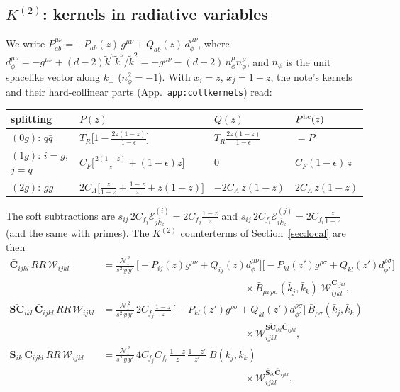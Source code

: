 \documentclass[11pt,a4paper]{article}
\newcommand{\bbC}[1]{\bar{\mathbf C}_{#1}}
\newcommand{\bbS}[1]{\bar{\mathbf S}_{#1}}
\newcommand{\bbSC}[1]{\bar{\mathbf{SC}}_{#1}}
\newcommand{\RR}{RR}
\newcommand{\W}[1]{\mathcal W_{#1}}
\newcommand{\jb}{\bar k_{j}}
\newcommand{\kb}{\bar k_{k}}
\newcommand{\E}[3]{\mathcal E^{(#1)}_{#2#3}}
\newcommand{\eps}{\epsilon}
\newcommand{\Norms}{\mathcal N_1^{\,2}}
\begin{document}
\subsection{$K^{(2)}$: kernels in radiative variables}
\label{sec:kerK2}

We write $P^{\mu\nu}_{ab}=-P_{ab}(z)\,g^{\mu\nu}+Q_{ab}(z)\,d^{\mu\nu}_\phi$, where $d^{\mu\nu}_\phi=-g^{\mu\nu}+(d-2)\tilde k^\mu\tilde k^\nu/\tilde k^2=-g^{\mu\nu}-(d-2)\,n_\phi^\mu n_\phi^\nu$,
and $n_\phi$ is the unit spacelike vector along $k_\perp$ ($n_\phi^2=-1$). With $x_i=z$, $x_j=1-z$, the note's kernels and their hard-collinear parts
(App.~\texttt{app:collkernels}) read:
\begin{center}
\renewcommand{\arraystretch}{1.3}
\begin{tabular}{llll}\toprule
splitting & $P(z)$ & $Q(z)$ & $P^{\rm hc}(z)$\\\midrule
$(0g)$: $q\bar q$ & $T_R\big[1-\frac{2z(1-z)}{1-\eps}\big]$ & $T_R\frac{2z(1-z)}{1-\eps}$ & $=P$\\
$(1g)$: $i=g$, $j=q$ & $C_F\big[\frac{2(1-z)}{z}+(1-\eps)z\big]$ & $0$ & $C_F(1-\eps)\,z$\\
$(2g)$: $gg$ & $2C_A\big[\frac{z}{1-z}+\frac{1-z}{z}+z(1-z)\big]$ & $-2C_A\,z(1-z)$ & $2C_A\,z(1-z)$\\\bottomrule
\end{tabular}
\end{center}
The soft subtractions are $s_{ij}\,2C_{f_j}\E{i}{j}{\kb}=2C_{f_j}\frac{1-z}{z}$ and $s_{ij}\,2C_{f_i}\E{j}{i}{\kb}=2C_{f_i}\frac{z}{1-z}$
(and the same with primes). The $K^{(2)}$ counterterms of Section~\ref{sec:local} are then
\begin{align}
\bbC{ijkl}\,\RR\,\W{ijkl}
&=\frac{\Norms}{s^2\,y\,y'}\,
\big[-P_{ij}(z)g^{\mu\nu}+Q_{ij}(z)d^{\mu\nu}_\phi\big]
\big[-P_{kl}(z')g^{\rho\sigma}+Q_{kl}(z')d^{\rho\sigma}_{\phi'}\big]\nonumber\\
&\hspace{6cm}\times\bar B_{\mu\nu\rho\sigma}(\jb,\kb)\;\W{ijkl}^{\bbC{ijkl}},
\label{eq:CijklRad}\\
\bbSC{ikl}\,\bbC{ijkl}\,\RR\,\W{ijkl}
&=\frac{\Norms}{s^2\,y\,y'}\,2C_{f_j}\frac{1-z}{z}\,
\big[-P_{kl}(z')g^{\rho\sigma}+Q_{kl}(z')d^{\rho\sigma}_{\phi'}\big]\,\bar B_{\rho\sigma}(\jb,\kb)\nonumber\\
&\hspace{6cm}\times\W{ijkl}^{\bbSC{ikl}\bbC{ijkl}},\\
\bbS{ik}\,\bbC{ijkl}\,\RR\,\W{ijkl}
&=\frac{\Norms}{s^2\,y\,y'}\,4C_{f_j}C_{f_l}\,\frac{1-z}{z}\,\frac{1-z'}{z'}\;\bar B(\jb,\kb)\nonumber\\
&\hspace{6cm}\times\W{ijkl}^{\bbS{ik}\bbC{ijkl}},
\end{align}
\end{document}
